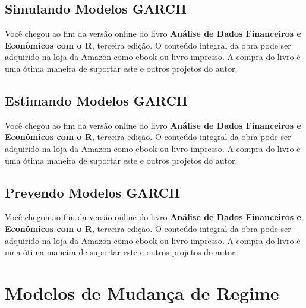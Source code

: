 \documentclass[
  11pt,
]{book}
\newenvironment{pleasebuyit}
{\begin{noteblock}
		
	} {\end{noteblock}}
\begin{document}
\hypertarget{simulando-modelos-garch}{%
\subsection{Simulando Modelos GARCH}\label{simulando-modelos-garch}}

\begin{pleasebuyit}
Você chegou ao fim da versão online do livro \textbf{Análise de Dados
Financeiros e Econômicos com o R}, terceira edição. O conteúdo integral
da obra pode ser adquirido na loja da Amazon como
\href{https://www.amazon.com.br/dp/B08WNC27ZY}{ebook} ou
\href{https://www.amazon.com/dp/B08WP8CCDB}{livro impresso}. A compra do
livro é uma ótima maneira de suportar este e outros projetos do autor.
\end{pleasebuyit}

\hypertarget{estimating-garch}{%
\subsection{Estimando Modelos GARCH}\label{estimating-garch}}

\begin{pleasebuyit}
Você chegou ao fim da versão online do livro \textbf{Análise de Dados
Financeiros e Econômicos com o R}, terceira edição. O conteúdo integral
da obra pode ser adquirido na loja da Amazon como
\href{https://www.amazon.com.br/dp/B08WNC27ZY}{ebook} ou
\href{https://www.amazon.com/dp/B08WP8CCDB}{livro impresso}. A compra do
livro é uma ótima maneira de suportar este e outros projetos do autor.
\end{pleasebuyit}

\hypertarget{prevendo-modelos-garch}{%
\subsection{Prevendo Modelos GARCH}\label{prevendo-modelos-garch}}

\begin{pleasebuyit}
Você chegou ao fim da versão online do livro \textbf{Análise de Dados
Financeiros e Econômicos com o R}, terceira edição. O conteúdo integral
da obra pode ser adquirido na loja da Amazon como
\href{https://www.amazon.com.br/dp/B08WNC27ZY}{ebook} ou
\href{https://www.amazon.com/dp/B08WP8CCDB}{livro impresso}. A compra do
livro é uma ótima maneira de suportar este e outros projetos do autor.
\end{pleasebuyit}

\hypertarget{mudanca-regime}{%
\section{Modelos de Mudança de Regime}\label{mudanca-regime}}
\end{document}

